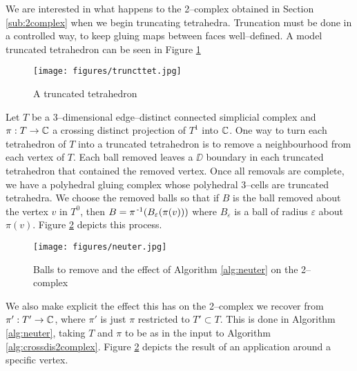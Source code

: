 We are interested in what happens to the 2--complex obtained in Section \ref{sub:2complex} when we begin truncating tetrahedra.
Truncation must be done in a controlled way, to keep gluing maps between faces well--defined.
A model truncated tetrahedron can be seen in Figure \ref{fig:truncttet}

\begin{figure}
	\centering
	\captionsetup{justification=centering}
	\caption{A truncated tetrahedron}
	\texttt{[image: figures/truncttet.jpg]}
	\label{fig:truncttet}
\end{figure}

Let $T$ be a 3--dimensional edge--distinct connected simplicial complex and $\pi:T\to\mathbb{C}$ a crossing distinct projection of $T^1$ into $\mathbb{C}$.
One way to turn each tetrahedron of $T$ into a truncated tetrahedron is to remove a neighbourhood from each vertex of $T$.
Each ball removed leaves a $\DD$ boundary in each truncated tetrahedron that contained the removed vertex.
Once all removals are complete, we have a polyhedral gluing complex whose polyhedral 3--cells are truncated tetrahedra.
We choose the removed balls so that if $B$ is the ball removed about the vertex $v$ in $T^0$, then $B = \pi^{\,\text{-}1}(B_\varepsilon(\pi(v)))$ where $B_\varepsilon$ is a ball of radius $\varepsilon$ about $\pi(v)$.
Figure \ref{fig:neuter} depicts this process.

\begin{figure}
	\centering
	\captionsetup{justification=centering}
	\caption{Balls to remove and the effect of Algorithm \ref{alg:neuter} on the 2--complex}
	\texttt{[image: figures/neuter.jpg]}
	\label{fig:neuter}
\end{figure}

We also make explicit the effect this has on the 2--complex we recover from $\pi':T'\to\mathbb{C}$, where $\pi'$ is just $\pi$ restricted to $T'\subset T$.
This is done in Algorithm \ref{alg:neuter}, taking $T$ and $\pi$ to be as in the input to Algorithm \ref{alg:crossdis2complex}.
Figure \ref{fig:neuter} depicts the result of an application around a specific vertex.

\begin{algorithm}[h]
	\caption{Generating a 2--complex from a truncated linear tetrahedral projection}
	\label{alg:neuter}
\end{algorithm}